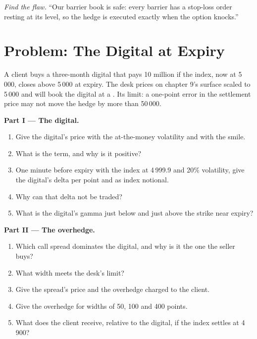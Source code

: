 \begin{exercise}[$\star\star\star$]\label{exo:dv:barriers-and-digitals:8}
\emph{Find the flaw.} ``Our barrier book is safe: every barrier has a stop-loss order resting at its level, so the
hedge is executed exactly when the option knocks.''
\end{exercise}

\section{Problem: The Digital at Expiry}

\begin{problem}\label{pb:dv:barriers-and-digitals:1}
A client buys a three-month digital that pays 10 million if the index, now at 5\,000, closes above 5\,000 at expiry. The
desk prices on chapter 9's surface scaled to 5\,000 and will book the digital at a . Its limit: a
one-point error in the settlement price may not move the hedge by more than 50\,000.

\medskip\noindent\textbf{Part I --- The digital.}
\begin{enumerate}
\item Give the digital's price with the at-the-money volatility and with the smile.
\item What is the  term, and why is it positive?
\item One minute before expiry with the index at 4\,999.9 and 20\% volatility, give the digital's delta per point and as
index notional.
\item Why can that delta not be traded?
\item What is the digital's gamma just below and just above the strike near expiry?
\end{enumerate}

\medskip\noindent\textbf{Part II --- The overhedge.}
\begin{enumerate}[resume]
\item Which call spread dominates the digital, and why is it the one the seller buys?
\item What width meets the desk's limit?
\item Give the spread's price and the overhedge charged to the client.
\item Give the overhedge for widths of 50, 100 and 400 points.
\item What does the client receive, relative to the digital, if the index settles at 4\,900?
\end{enumerate}


\end{problem}
